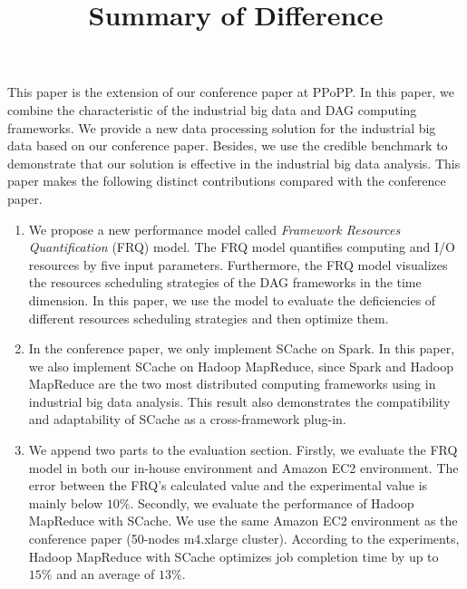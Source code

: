 \documentclass[12pt,reqno]{amsart}
\title{Summary of Difference}
\theoremstyle{plain}
\numberwithin{equation}{section}
\theoremstyle{plain}
\numberwithin{equation}{section}
\begin{document}
\maketitle



This paper is the extension of our conference paper at PPoPP. 
In this paper, we combine the characteristic of the industrial big data and DAG computing frameworks.
We provide a new data processing solution for the industrial big data based on our conference paper.
Besides, we use the credible benchmark to demonstrate that our solution is effective in the industrial big data analysis.
This paper makes the following distinct contributions compared with the conference paper.

\begin{enumerate}
\item 
We propose a new performance model called \textit{Framework Resources Quantification} (FRQ) model.
The FRQ model quantifies computing and I/O resources by five input parameters. 
Furthermore, the FRQ model visualizes the resources scheduling strategies of the DAG frameworks in the time dimension. 
In this paper, we use the model to evaluate the deficiencies of different resources scheduling strategies and then optimize them.
\item 
In the conference paper, we only implement SCache on Spark. 
In this paper, we also implement SCache on Hadoop MapReduce, since Spark and Hadoop MapReduce are the two most distributed computing frameworks using in industrial big data analysis.
This result also demonstrates the compatibility and adaptability of SCache as a cross-framework plug-in.
\item
We append two parts to the evaluation section. 
Firstly, we evaluate the FRQ model in both our in-house environment and Amazon EC2 environment. The error between the FRQ’s calculated value and the experimental value is mainly below $10\%$. 
Secondly, we evaluate the performance of Hadoop MapReduce with SCache. We use the same Amazon EC2 environment as the conference paper (50-nodes m4.xlarge cluster).
According to the experiments, Hadoop MapReduce with SCache optimizes job completion time by up to $15\%$ and an average of $13\%$.
\end{enumerate}
\end{document}

